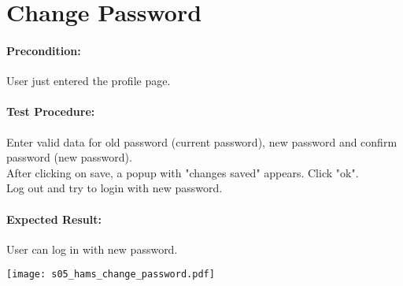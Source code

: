 \documentclass{scrreprt}
\begin{document}
\begin{minipage}[c]{0.4\textwidth}
\section{Change Password}

\paragraph{Precondition:}
User just entered the profile page.\\

\paragraph{Test Procedure:}
Enter valid data for old password (current password), new password and
confirm password (new password).\\
After clicking on save, a popup with "changes saved" appears. Click "ok".\\
Log out and try to login with new password.\\

\paragraph{Expected Result:}
User can log in with new password.

\end{minipage}
\hfill
\begin{minipage}[c]{0.5\textwidth}
	\texttt{[image: s05\_hams\_change\_password.pdf]}
\end{minipage}
\end{document}

